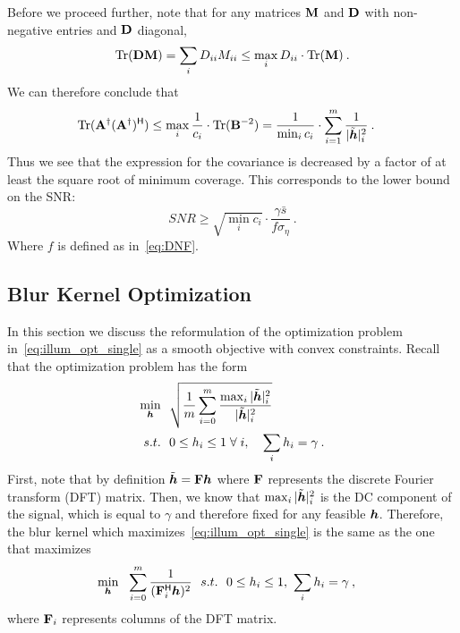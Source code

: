 Before we proceed further, note that for any matrices $\mathbf{M}$ and $\mathbf{D}$ with non-negative entries and $\mathbf{D}$ diagonal,
\[\mathrm{Tr}(\mathbf{D}\mathbf{M}) = \sum_{i} D_{ii} M_{ii}  \leq \max_{i} D_{ii} \cdot \mathrm{Tr}(\mathbf{M})\:.\]
We can therefore conclude that
\begin{align*}
    \mathrm{Tr}(\mathbf{A}^\dagger (\mathbf{A}^\dagger)^{\mathsf{H}})&\leq \max_{i}\frac{1}{c_i}\cdot \mathrm{Tr}(\mathbf{B}^{-2})
    =
    \frac{1}{\min_{i} c_i}   \cdot \sum_{i=1}^m \frac{1}{|\tilde {\bm{h}}|_i^2}\:.
\end{align*}
Thus we see that the expression for the covariance is decreased by a factor of at least the square root of minimum coverage. This corresponds to the lower bound on the SNR:
\[SNR \geq \sqrt{{\min_{i} c_i}}\cdot \frac{ \gamma\bar s}{ f \sigma_\eta  }\:.\]
Where $f$ is defined as in~\eqref{eq:DNF}.



\subsection{Blur Kernel Optimization} \label{sec:optimization_app}

In this section we discuss the reformulation of
the optimization problem in~\eqref{eq:illum_opt_single} as a smooth objective with convex constraints.
Recall that the optimization problem has the form
\begin{align*}
\min_{\bm{h}}&~~ \sqrt{\frac{1}{m} \sum_{i=0}^m \frac{\max_i{|\tilde{\bm{h}}|_i^2}}{|\tilde{\bm{h}}|_i^2}} \\
  s.t. &~~0 \leq h_i \leq 1 \; \forall \; i, \quad
  \sum_{i} h_i = \gamma \:.
\end{align*}
First, note that by definition $\tilde {\bm{h}}=\mathbf{F}\bm{h}$ where $\mathbf{F}$ represents the discrete Fourier transform (DFT) matrix.
Then, we know that $\max_i{|\tilde{\bm{h}}|_i^2}$ is the DC component of the signal, which is equal to $\gamma$ and therefore fixed for any feasible $\bm{h}$.
Therefore, the blur kernel which maximizes~\eqref{eq:illum_opt_single} is the same as the one that maximizes
\begin{align*}
\label{eq:opt_smooth}
\min_{\bm{h}}&~~ \sum_{i=0}^m \frac{1}{(\mathbf{F}_i^{\mathsf{H}}\bm{h})^2} ~~
  s.t. ~~0 \leq h_i \leq 1, ~
  \sum_{i} h_i = \gamma \:,
\end{align*}
where $\mathbf{F}_i$ represents columns of the DFT matrix.

